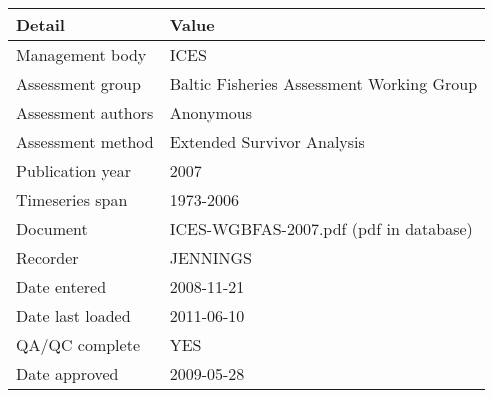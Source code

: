 \begin{table}[htb]
\centering
\begin{tabular}{lp{7cm}}
\toprule
Detail & Value \\
\midrule
Management body    & ICES                                      \\
Assessment group   & Baltic Fisheries Assessment Working Group \\
Assessment authors & Anonymous                                 \\
Assessment method  & Extended Survivor Analysis                \\
Publication year   & 2007                                      \\
Timeseries span    & 1973-2006                                 \\
Document           & ICES-WGBFAS-2007.pdf (pdf in database)    \\
Recorder           & JENNINGS                                  \\
Date entered       & 2008-11-21                                \\
Date last loaded   & 2011-06-10                                \\
QA/QC complete     & YES                                       \\
Date approved      & 2009-05-28                                \\
\bottomrule
\end{tabular}
\label{tab:assessdet}
\end{table}

